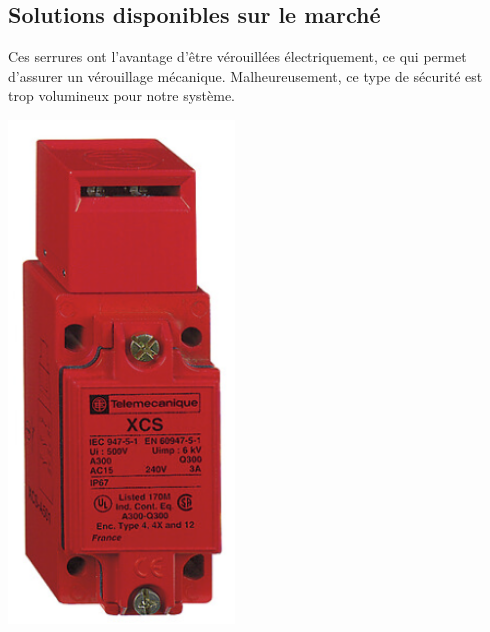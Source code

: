 \subsection{Solutions disponibles sur le marché}
\begin{minipage}[c]{0.6\textwidth}

    Ces serrures ont l'avantage d'être vérouillées électriquement, ce qui permet d'assurer un vérouillage mécanique. Malheureusement, ce type de sécurité est trop volumineux pour notre système.
\end{minipage}\hfill
\begin{minipage}[c]{0.35\textwidth}
    \begin{center}
        \includegraphics[width=0.45\textwidth]{assets/figures/Protections_laser/Securite_electrique/serrure_telemecanique.png}
    \end{center}
    \label{interrupteur_telemecanique}
\end{minipage}

